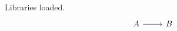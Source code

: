 \documentclass{article}
\begin{document}
Libraries loaded.
\[
\begin{tikzcd}
A\arrow[r]&B
\end{tikzcd}
\]
\end{document}
